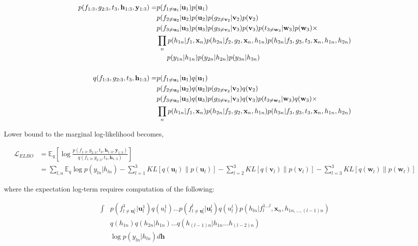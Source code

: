\documentclass{article}
\begin{document}
\begin{align*}
    p(f_{1:3},g_{2:3}, t_3, \mathbf{h}_{1:3}, \mathbf{y}_{1:3}) =&
    p(f_{1\neq \mathbf{u}_1}|\mathbf{u}_1)p(\mathbf{u}_1)\\
    & p(f_{2\neq \mathbf{u}_2}|\mathbf{u}_2)p(\mathbf{u}_2) p(g_{2\neq \mathbf{v}_2}|\mathbf{v}_2)p(\mathbf{v}_2)\\
    & p(f_{3\neq \mathbf{u}_3}|\mathbf{u}_3)p(\mathbf{u}_3) p(g_{3\neq \mathbf{v}_3}|\mathbf{v}_3)p(\mathbf{v}_3) p(t_{3\neq \mathbf{w}_3}|\mathbf{w}_3)p(\mathbf{w}_3)\times\\
    & \prod_n p(h_{1n}|f_1,\mathbf{x}_n) p(h_{2n}|f_2, g_2, \mathbf{x}_n, h_{1n}) p(h_{3n}|f_3,g_3,t_3, \mathbf{x}_n, h_{1n}, h_{2n})\\
    & \hspace{1.5em} p(y_{1n}|h_{1n})p(y_{2n}|h_{2n})p(y_{3n}|h_{3n})\\
    \\
    q(f_{1:3},g_{2:3}, t_3, \mathbf{h}_{1:3}) =&
    p(f_{1\neq \mathbf{u}_1}|\mathbf{u}_1)q(\mathbf{u}_1)\\
    & p(f_{2\neq \mathbf{u}_2}|\mathbf{u}_2)q(\mathbf{u}_2) p(g_{2\neq \mathbf{v}_2}|\mathbf{v}_2)q(\mathbf{v}_2)\\
    & p(f_{3\neq \mathbf{u}_3}|\mathbf{u}_3)q(\mathbf{u}_3) p(g_{3\neq \mathbf{v}_3}|\mathbf{v}_3)q(\mathbf{v}_3) p(t_{3\neq \mathbf{w}_3}|\mathbf{w}_3)q(\mathbf{w}_3)\times\\
    & \prod_n p(h_{1n}|f_1,\mathbf{x}_n) p(h_{2n}|f_2, g_2, \mathbf{x}_n, h_{1n}) p(h_{3n}|f_3,g_3,t_3, \mathbf{x}_n, h_{1n}, h_{2n})
\end{align*}

Lower bound to the marginal log-likelihood becomes,

\begin{align*}
    \mathcal{L}_{ELBO} &=  \mathds{E}_q\left[\log\frac{p(f_{1:3},g_{2:3}, t_3, \mathbf{h}_{1:3}, \mathbf{y}_{1:3})}{q(f_{1:3},g_{2:3}, t_3, \mathbf{h}_{1:3})}\right]\\
    &= \sum_{l,n} \mathds{E}_q \log p(y_{ln}|h_{ln}) - \sum_{l=1}^3 KL\left[q(\mathbf{u}_l)\|p(\mathbf{u}_l)\right] - \sum_{l=2}^3 KL\left[q(\mathbf{v}_l)\|p(\mathbf{v}_l)\right] - \sum_{l=3}^3 KL\left[q(\mathbf{w}_l)\|p(\mathbf{w}_l)\right]
\end{align*}

where the expectation log-term requires computation of the following:

\begin{align*}
    \int & p(f^{1}_{l\neq\mathbf{u}_l^1}|\mathbf{u}_l^1)q(u_l^1)\dots
    p(f^{l}_{l\neq\mathbf{u}_l^l}|\mathbf{u}_l^l)q(u_l^l) p(h_{ln}|f_l^{1...l},\mathbf{x}_n,h_{1n,...,(l-1)n})\\
    & q(h_{1n}) q(h_{2n}|h_{1n})\dots q(h_{(l-1)n}|h_{1n}\dots h_{(l-2)n})\\ 
    & \log p(y_{ln}|h_{ln}) d\mathbf{h}
\end{align*}
\end{document}
